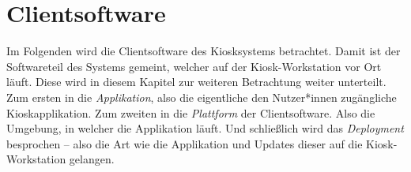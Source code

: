 \section{Clientsoftware}
\label{sec:frontend}

\iffalse
- viele Anforderungen
- Fokus der Thesis
- beschreibt alle Schritte um eine Webandwendung in eine gelunge Kioskapplikation zu bringen
- Was meint Frontend: die eigentliche Kioskapplikation, Plattform: die Umgebung der Applikation, Deployment der Applikation
- SPA Routing im Frontend
- rein mit Webtechnologien, und noch weiter rein mit Browsertechnologien: beschränken auf HTML, CSS und JS
- mit Electron bindet man sich an die Plattform
\fi

Im Folgenden wird die Clientsoftware des Kiosksystems betrachtet. Damit ist der 
Softwareteil des Systems gemeint, welcher auf der Kiosk-Workstation vor 
Ort läuft. Diese wird in diesem Kapitel zur weiteren Betrachtung 
weiter unterteilt. Zum ersten in die \emph{Applikation}, 
also die eigentliche den Nutzer*innen zugängliche Kioskapplikation.
Zum zweiten in die \emph{Plattform} der Clientsoftware.
Also die Umgebung, in welcher die Applikation läuft.
Und schließlich wird das \emph{Deployment} besprochen -- also die Art wie die Applikation und 
Updates dieser auf die Kiosk-Workstation gelangen.\\




